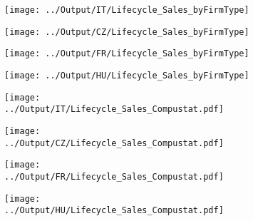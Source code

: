 \documentclass[12pt,notitlepage]{article}
\begin{document}
\begin{figure}[!htpb]
\centering
\caption{Sales (Average)}
\begin{subfigure}{.49\textwidth}
    \centering
 \texttt{[image: ../Output/IT/Lifecycle\_Sales\_byFirmType]}
\end{subfigure}%
\begin{subfigure}{.49\textwidth}
    \centering
 \texttt{[image: ../Output/CZ/Lifecycle\_Sales\_byFirmType]}
\end{subfigure}
\begin{subfigure}{.49\textwidth}
    \centering
 \texttt{[image: ../Output/FR/Lifecycle\_Sales\_byFirmType]}
\end{subfigure}%
\begin{subfigure}{.49\textwidth}
    \centering
 \texttt{[image: ../Output/HU/Lifecycle\_Sales\_byFirmType]}
\end{subfigure}
\end{figure}
\pagebreak

\begin{figure}[!htpb]
\centering
\caption{Sales (Average)}
\begin{subfigure}{.49\textwidth}
    \centering
 \texttt{[image: ../Output/IT/Lifecycle\_Sales\_Compustat.pdf]}
\end{subfigure}%
\begin{subfigure}{.49\textwidth}
    \centering
 \texttt{[image: ../Output/CZ/Lifecycle\_Sales\_Compustat.pdf]}
\end{subfigure}
\begin{subfigure}{.49\textwidth}
    \centering
 \texttt{[image: ../Output/FR/Lifecycle\_Sales\_Compustat.pdf]}
\end{subfigure}%
\begin{subfigure}{.49\textwidth}
    \centering
 \texttt{[image: ../Output/HU/Lifecycle\_Sales\_Compustat.pdf]}
\end{subfigure}
\end{figure}
\pagebreak
\end{document}
